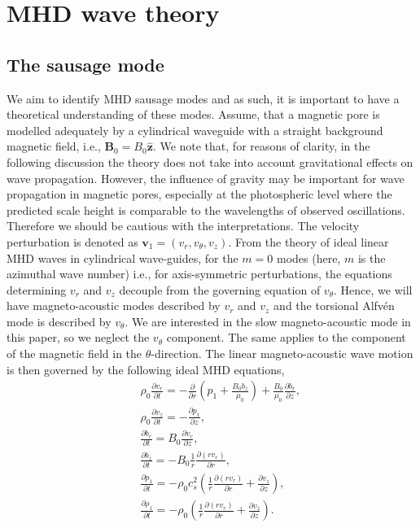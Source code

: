 \section{MHD wave theory}
\label{Wave}
    
    \subsection{The sausage mode}
    \label{Saus}
    
    We aim to identify MHD sausage modes and as such, it is important to have a theoretical understanding of these modes.
    Assume, that a magnetic pore is modelled adequately by a cylindrical waveguide with a straight background magnetic field, i.e., $\textbf{B}_0=B_0\hat{\textbf{z}}$.
    We	note that, for reasons of clarity, in the following discussion the theory does not take into account gravitational effects on wave propagation.
    However, the influence of gravity may be important for wave propagation in magnetic pores, especially at the photospheric level where the predicted scale height is comparable to the wavelengths of observed oscillations.
    Therefore we should be cautious with the interpretations.
    The velocity perturbation is denoted as $\textbf{v}_1= (v_r,v_{\theta},v_z)$.
    From the theory of ideal linear MHD waves in cylindrical wave-guides, for the $m=0$ modes (here, $m$ is the azimuthal wave number) i.e., for axis-symmetric perturbations, the equations determining $v_r$ and $v_z$ decouple from the governing equation of $v_{\theta}$.
    Hence, we will have magneto-acoustic modes described by $v_r$ and $v_z$ and the torsional Alfv\'en mode is described by $v_{\theta}$.
    We are interested in the slow magneto-acoustic mode in this paper, so we neglect the $v_{\theta}$ component.
    The	same applies to the component of the magnetic field in the $\theta$-direction. 
    The linear magneto-acoustic wave motion is then governed by the following ideal MHD equations,
    \begin{align}
        &&\rho_0 \frac{\partial v_r}{\partial t}=-\frac{\partial}{\partial r}
        \left(p_1+\frac{B_0b_z}{\mu_0}\right)+\frac{B_0}{\mu_0}\frac{\partial b_r}{\partial z},
        \label{eq:mom_r}\\
        &&\rho_0\frac{\partial v_z}{\partial t}=-\frac{\partial p_1}{\partial z},
        \label{eq:mom_z}\\
        &&\frac{\partial b_r}{\partial t}=B_0\frac{\partial v_r}{\partial z},
        \label{eq:mag_r}\\
        &&\frac{\partial b_z}{\partial t}=-B_0\frac{1}{r}\frac{\partial (rv_r)}{\partial r},
        \label{eq:mag_z}\\
        &&\frac{\partial p_1}{\partial t}=-\rho_0
        c_s^2\left(\frac{1}{r}\frac{\partial(rv_r)}{\partial r}+\frac{\partial v_z}{\partial z}\right),
        \label{eq:press1}\\
        &&\frac{\partial \rho_1}{\partial t}=-\rho_0\left(\frac{1}{r}\frac{\partial (rv_r)}{\partial r}+\frac{\partial v_z}{\partial z}\right).
        \label{eq:den}
    \end{align}
